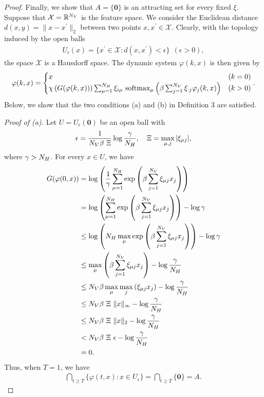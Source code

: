 \begin{proof}
Finally, we show that $A = \{\bm{0}\}$ is an attracting set for every fixed $\xi$.
Suppose that $\mathcal{X} = \mathbb{R}^{N_{V}}$ is the feature space.
We consider the Euclidean distance $d(x, y) = \|x - x^{\prime}\|_{2}$ between two points $x, x^{\prime} \in \mathcal{X}$.
Clearly, with the topology induced by the open balls
\begin{align}
U_{\epsilon}(x) = \{ x^{\prime} \in \mathcal{X} : d(x, x^{\prime}) < \epsilon\}~~(\epsilon > 0),
\end{align}
the space $\mathcal{X}$ is a Hausdorff space. The dynamic system $\varphi(k, x)$ is then given by
\begin{align}
\varphi(k, x) =
\begin{cases}
x & (k = 0)\\
\chi
\left(
G(\varphi(k, x))
\right)
\sum_{\mu=1}^{N_{H}}
\xi_{i\mu}
~\mathrm{softmax}_{\mu}
\left(
\beta \sum_{j=1}^{N_{V}} 
\xi_{\cdot j} \varphi_{j}(k, x)
\right) & (k > 0)
\end{cases}.
\end{align}
Below, we show that the two conditions (a) and (b) in Definition 3 are satisfied.

\noindent \textit{Proof of (a).}
Let $U = U_{\epsilon}(\bm{0})$ be an open ball with
\begin{align}
\label{eq:38}
\epsilon = \frac{1}{N_{V} \beta~\Xi} \log \frac{\gamma}{N_{H}},
\quad
\Xi = \max_{\mu, j} |\xi_{\mu j}|,
\end{align}
where $\gamma > N_{H}$.
For every $x \in U$, we have
\begin{align}
G(\varphi (0, x))
&=
\log
\left(
\frac{1}{\gamma}
\sum_{\mu = 1}^{N_{H}}
\exp\left({\beta \sum_{j=1}^{N_{V}} \xi_{\mu j} x_{j}}\right)
\right)\\
&=
\log \left(
\sum_{\mu = 1}^{N_{H}}
\exp\left({\beta \sum_{j=1}^{N_{V}} \xi_{\mu j} x_{j}}\right)
\right)
- \log \gamma\\
&\leq
\log \left(
N_{H}
\max_{\mu} \exp \left( {\beta \sum_{j=1}^{N_{V}} \xi_{\mu j} x_{j}}\right)\right)
- \log \gamma\\
&\leq
\max_{\mu} \left({\beta \sum_{j=1}^{N_{V}} \xi_{\mu j} x_{j}}
\right) - \log \frac{\gamma}{N_{H}}\\
&\leq
N_{V} \beta \max_{\mu} \max_{j} \left({\xi_{\mu j} x_{j}}
\right) - \log \frac{\gamma}{N_{H}}\\
& \leq
N_{V} \beta~\Xi~\|x\|_{\infty}
 - \log \frac{\gamma}{N_{H}}\\
 & \leq
N_{V} \beta~\Xi~\|x\|_{2}
 - \log \frac{\gamma}{N_{H}}\\
& <
N_{V} \beta~\Xi~\epsilon
 - \log \frac{\gamma}{N_{H}}\\
&= 0.
\end{align}
Thus, when $T = 1$, we have
\begin{align}
\bigcap_{t \ge T} \{\varphi(t, x) : x \in U_{\epsilon}\}
= \bigcap_{t \ge T} \{\bm{0}\} =
A.
\end{align}


\end{proof}
